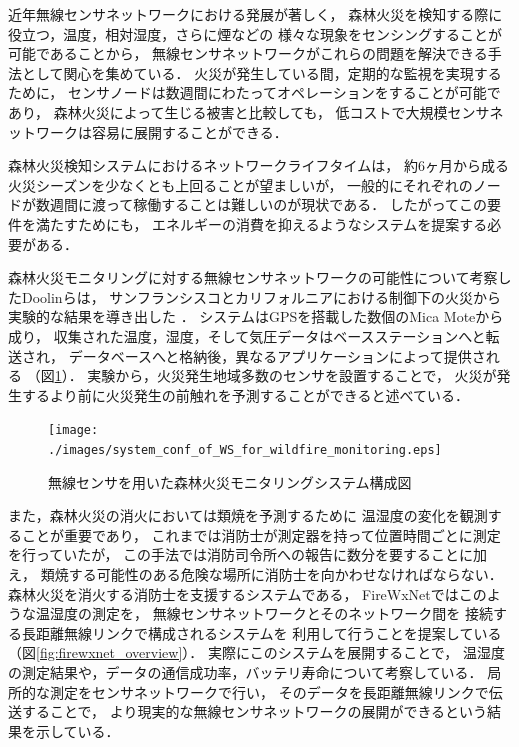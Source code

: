 近年無線センサネットワークにおける発展が著しく，
森林火災を検知する際に役立つ，温度，相対湿度，さらに煙などの
様々な現象をセンシングすることが可能であることから，
無線センサネットワークがこれらの問題を解決できる手法として関心を集めている．
火災が発生している間，定期的な監視を実現するために，
センサノードは数週間にわたってオペレーションをすることが可能であり，
森林火災によって生じる被害と比較しても，
低コストで大規模センサネットワークは容易に展開することができる．


森林火災検知システムにおけるネットワークライフタイムは，
約6ヶ月から成る火災シーズンを少なくとも上回ることが望ましいが，
一般的にそれぞれのノードが数週間に渡って稼働することは難しいのが現状である．
したがってこの要件を満たすためにも，
エネルギーの消費を抑えるようなシステムを提案する必要がある．


森林火災モニタリングに対する無線センサネットワークの可能性について考察したDoolinらは，
サンフランシスコとカリフォルニアにおける制御下の火災から実験的な結果を導き出した
\cite{doi:10.1117/12.605655}．
システムはGPSを搭載した数個のMica Moteから成り，
収集された温度，湿度，そして気圧データはベースステーションへと転送され，
データベースへと格納後，異なるアプリケーションによって提供される
（図\ref{fig:system_conf_of_WS_for_wildfire_monitoring}）．
実験から，火災発生地域多数のセンサを設置することで，
火災が発生するより前に火災発生の前触れを予測することができると述べている．

\begin{figure}[htbp]
 \begin{center}
  \texttt{[image: ./images/system\_conf\_of\_WS\_for\_wildfire\_monitoring.eps]}
 \end{center}
 \caption{無線センサを用いた森林火災モニタリングシステム構成図}
 \label{fig:system_conf_of_WS_for_wildfire_monitoring}
\end{figure}



また，森林火災の消火においては類焼を予測するために
温湿度の変化を観測することが重要であり，
これまでは消防士が測定器を持って位置時間ごとに測定を行っていたが，
この手法では消防司令所への報告に数分を要することに加え，
類焼する可能性のある危険な場所に消防士を向かわせなければならない．
森林火災を消火する消防士を支援するシステムである，
FireWxNet\cite{conf/mobisys/HartungHSH06}ではこのような温湿度の測定を，
無線センサネットワークとそのネットワーク間を
接続する長距離無線リンクで構成されるシステムを
利用して行うことを提案している（図\ref{fig:firewxnet_overview}）．
実際にこのシステムを展開することで，
温湿度の測定結果や，データの通信成功率，バッテリ寿命について考察している．
局所的な測定をセンサネットワークで行い，
そのデータを長距離無線リンクで伝送することで，
より現実的な無線センサネットワークの展開ができるという結果を示している．


